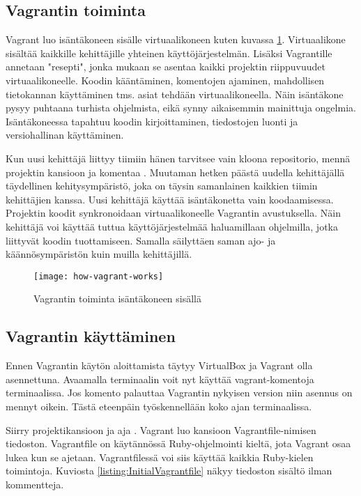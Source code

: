 \subsection{Vagrantin toiminta}
Vagrant luo isäntäkoneen sisälle virtuaalikoneen kuten kuvassa \ref{fig:how-vagrant-works}. Virtuaalikone sisältää kaikkille kehittäjille yhteinen käyttöjärjestelmän. Lisäksi Vagrantille annetaan "resepti", jonka mukaan se asentaa kaikki projektin riippuvuudet virtuaalikoneelle. Koodin kääntäminen, komentojen ajaminen, mahdollisen tietokannan käyttäminen tms. asiat tehdään virtuaalikoneella. Näin isäntäkone pysyy puhtaana turhista ohjelmista, eikä synny aikaisemmin mainittuja ongelmia. Isäntäkoneessa tapahtuu koodin kirjoittaminen, tiedostojen luonti ja versiohallinan käyttäminen.

Kun uusi kehittäjä liittyy tiimiin hänen tarvitsee vain kloona repositorio, mennä projektin kansioon ja komentaa . Muutaman hetken päästä uudella kehittäjällä täydellinen kehitysympäristö, joka on täysin samanlainen kaikkien tiimin kehittäjien kanssa. Uusi kehittäjä käyttää isäntäkonetta vain koodaamisessa. Projektin koodit synkronoidaan virtuaalikoneelle Vagrantin avustuksella. Näin kehittäjä voi käyttää tuttua käyttöjärjestelmää haluamillaan ohjelmilla, jotka liittyvät koodin tuottamiseen. Samalla säilyttäen saman ajo- ja käännösympäristön kuin muilla kehittäjillä.

\begin{figure}[h]
  \texttt{[image: how-vagrant-works]}
  \caption{Vagrantin toiminta isäntäkoneen sisällä}
  \label{fig:how-vagrant-works}
\end{figure}

\subsection{Vagrantin käyttäminen}
Ennen Vagrantin käytön aloittamista täytyy VirtualBox ja Vagrant olla asennettuna. Avaamalla terminaalin voit nyt käyttää vagrant-komentoja terminaalissa. Jos komento  palauttaa Vagrantin nykyisen version niin asennus on mennyt oikein. Tästä eteenpäin työskennellään koko ajan terminaalissa.

Siirry projektikansioon ja aja . Vagrant luo kansioon Vagrantfile-nimisen tiedoston. Vagrantfile on käytännössä Ruby-ohjelmointi kieltä, jota Vagrant osaa lukea kun se ajetaan. Vagrantfilessä voi siis käyttää kaikkia Ruby-kielen toimintoja. Kuviosta \ref{listing:InitialVagrantfile} näkyy tiedoston sisältö ilman kommentteja.


